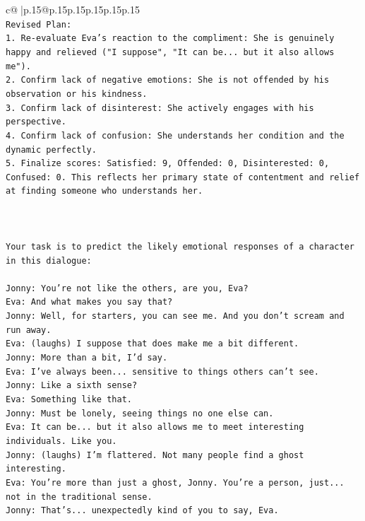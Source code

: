 \documentclass{article}
\begin{document}
{\begin{supertabular}{c@{$\;$}|p{.15\linewidth}@{}p{.15\linewidth}p{.15\linewidth}p{.15\linewidth}p{.15\linewidth}p{.15\linewidth}}
{{{\\ 
\texttt{Revised Plan:} \\
\texttt{1. Re{-}evaluate Eva's reaction to the compliment: She is genuinely happy and relieved ("I suppose", "It can be... but it also allows me").} \\
\texttt{2. Confirm lack of negative emotions: She is not offended by his observation or his kindness.} \\
\texttt{3. Confirm lack of disinterest: She actively engages with his perspective.} \\
\texttt{4. Confirm lack of confusion: She understands her condition and the dynamic perfectly.} \\
\texttt{5. Finalize scores: Satisfied: 9, Offended: 0, Disinterested: 0, Confused: 0. This reflects her primary state of contentment and relief at finding someone who understands her.} \\
\\ 
\\ 
\\ 
\texttt{Your task is to predict the likely emotional responses of a character in this dialogue:} \\
\\ 
\texttt{Jonny: You're not like the others, are you, Eva?} \\
\texttt{Eva: And what makes you say that?} \\
\texttt{Jonny: Well, for starters, you can see me. And you don't scream and run away.} \\
\texttt{Eva: (laughs) I suppose that does make me a bit different.} \\
\texttt{Jonny: More than a bit, I'd say. } \\
\texttt{Eva: I've always been... sensitive to things others can't see. } \\
\texttt{Jonny: Like a sixth sense?} \\
\texttt{Eva: Something like that. } \\
\texttt{Jonny: Must be lonely, seeing things no one else can.} \\
\texttt{Eva: It can be... but it also allows me to meet interesting individuals. Like you.} \\
\texttt{Jonny: (laughs) I'm flattered. Not many people find a ghost interesting.} \\
\texttt{Eva: You're more than just a ghost, Jonny. You're a person, just... not in the traditional sense.} \\
\texttt{Jonny: That's... unexpectedly kind of you to say, Eva.} \\
}}}
\end{supertabular}}
\end{document}
